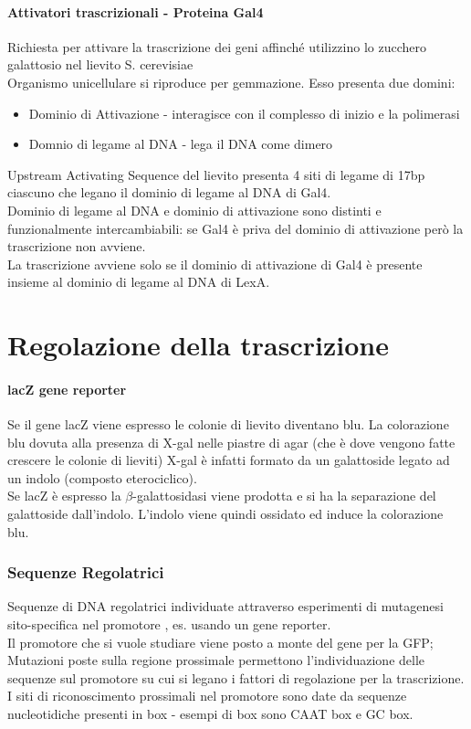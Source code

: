 \documentclass{article}
\begin{document}
\paragraph{Attivatori trascrizionali - Proteina Gal4}
Richiesta per attivare la trascrizione dei geni affinché utilizzino lo zucchero galattosio nel lievito S. cerevisiae\\
Organismo unicellulare si riproduce per gemmazione. Esso presenta due domini:
\begin{itemize}
    \item[] Dominio di Attivazione - interagisce con il complesso di inizio e la polimerasi
    \item[] Domnio di legame al DNA - lega il DNA come dimero
\end{itemize}
Upstream Activating Sequence del lievito presenta 4 siti di legame di 17bp ciascuno che legano il dominio di legame al DNA di Gal4.\\
Dominio di legame al DNA e dominio di attivazione sono distinti e funzionalmente intercambiabili: se Gal4 è priva del dominio di attivazione però la trascrizione non avviene.\\
La trascrizione avviene solo se il dominio di attivazione di Gal4
è presente insieme al dominio di legame al DNA di LexA.
\section{Regolazione della trascrizione}
\paragraph{lacZ gene reporter}
Se il gene lacZ viene espresso le colonie di lievito diventano blu. La colorazione blu dovuta alla presenza di X-gal
nelle piastre di agar (che è dove vengono fatte crescere le colonie di lieviti)
X-gal è infatti formato da un galattoside legato ad un indolo (composto eterociclico).\\ Se lacZ è
espresso la $\beta$-galattosidasi viene prodotta e si ha la separazione del galattoside dall'indolo.
L'indolo viene quindi ossidato ed induce la colorazione blu.
\subsubsection{Sequenze Regolatrici}
Sequenze di DNA regolatrici individuate attraverso esperimenti
di mutagenesi sito-specifica nel promotore , es. usando un
gene reporter.\\
Il promotore che si vuole studiare viene posto a monte del gene per la GFP;
Mutazioni poste sulla regione prossimale permettono l'individuazione delle sequenze sul
promotore su cui si legano i fattori di regolazione per la trascrizione.\\
I siti di riconoscimento prossimali nel promotore sono date da sequenze nucleotidiche presenti in box - esempi di box sono CAAT box e GC box.
\end{document}
